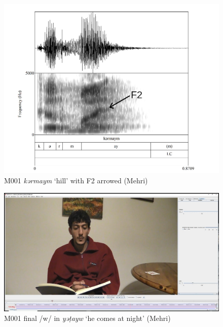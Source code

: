 \documentclass[output=paper]{langscibook}
\begin{document}
\begin{figure}[p]
\includegraphics[height=.4\textheight]{figures/a12Watsonetal-img008.png}
\caption{M001 \textit{kərmaym} ‘hill’ with F2 arrowed (Mehri)}
\label{fig:watson:8}
\end{figure}

\begin{figure}
\includegraphics[width=\textwidth]{figures/a12Watsonetal-img009.jpg}
\caption{M001 final /w/ in \textit{yəṭayw} ‘he comes at night’ (Mehri)}
\label{fig:watson:9}
\end{figure}
\end{document}
